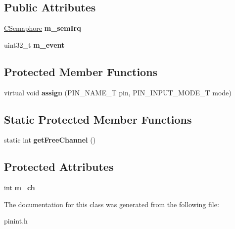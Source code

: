 \subsection*{Public Attributes}
\begin{DoxyCompactItemize}
\item 
\hypertarget{class_c_pin_i_n_t_a183f478d30ac65d5a3e85c7939db044e}{\hyperlink{class_c_semaphore}{C\-Semaphore} {\bfseries m\-\_\-sem\-Irq}}\label{class_c_pin_i_n_t_a183f478d30ac65d5a3e85c7939db044e}

\item 
\hypertarget{class_c_pin_i_n_t_a53b3ac0896504d345f4b6093cb22f3f3}{uint32\-\_\-t {\bfseries m\-\_\-event}}\label{class_c_pin_i_n_t_a53b3ac0896504d345f4b6093cb22f3f3}

\end{DoxyCompactItemize}
\subsection*{Protected Member Functions}
\begin{DoxyCompactItemize}
\item 
\hypertarget{class_c_pin_i_n_t_a762631f4e29ba2f09257af8892f8777e}{virtual void {\bfseries assign} (P\-I\-N\-\_\-\-N\-A\-M\-E\-\_\-\-T pin, P\-I\-N\-\_\-\-I\-N\-P\-U\-T\-\_\-\-M\-O\-D\-E\-\_\-\-T mode)}\label{class_c_pin_i_n_t_a762631f4e29ba2f09257af8892f8777e}

\end{DoxyCompactItemize}
\subsection*{Static Protected Member Functions}
\begin{DoxyCompactItemize}
\item 
\hypertarget{class_c_pin_i_n_t_ac638835b5fd1ca3f7c29af36677e2b0a}{static int {\bfseries get\-Free\-Channel} ()}\label{class_c_pin_i_n_t_ac638835b5fd1ca3f7c29af36677e2b0a}

\end{DoxyCompactItemize}
\subsection*{Protected Attributes}
\begin{DoxyCompactItemize}
\item 
\hypertarget{class_c_pin_i_n_t_a563b913b2126f003c0e1e2f3400a2ed2}{int {\bfseries m\-\_\-ch}}\label{class_c_pin_i_n_t_a563b913b2126f003c0e1e2f3400a2ed2}

\end{DoxyCompactItemize}


The documentation for this class was generated from the following file\-:\begin{DoxyCompactItemize}
\item 
pinint.\-h\end{DoxyCompactItemize}
